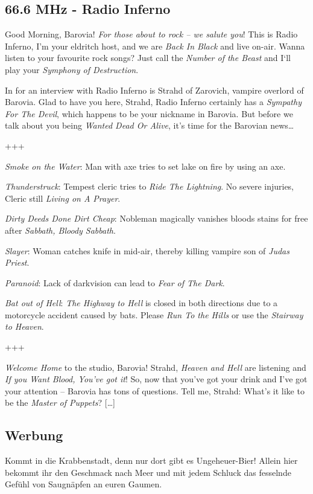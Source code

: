 \documentclass[final]{multiversum}
\begin{document}

\subsection{66.6 MHz - Radio Inferno}
Good Morning, Barovia! \textit{For those about to rock – we salute you}! This is Radio Inferno, I’m your eldritch host, and we are \textit{Back In Black} and live on-air. Wanna listen to your favourite rock songs? Just call the \textit{Number of the Beast} and I‘ll play your \textit{Symphony of Destruction}.

In for an interview with Radio Inferno is Strahd of Zarovich, vampire overlord of Barovia. Glad to have you here, Strahd, Radio Inferno certainly has a \textit{Sympathy For The Devil}, which happens to be your nickname in Barovia. But before we talk about you being \textit{Wanted Dead Or Alive}, it’s time for the Barovian news…

\centerline { +++ }

\textit{Smoke on the Water}: Man with axe tries to set lake on fire by using an axe.

\textit{Thunderstruck}: Tempest cleric tries to \textit{Ride The Lightning}. No severe injuries, Cleric still \textit{Living on A Prayer}.

\textit{Dirty Deeds Done Dirt Cheap}: Nobleman magically vanishes bloods stains for free after \textit{Sabbath, Bloody Sabbath}.

\textit{Slayer}: Woman catches knife in mid-air, thereby killing vampire son of \textit{Judas Priest}.

\textit{Paranoid}: Lack of darkvision can lead to \textit{Fear of The Dark}.

\textit{Bat out of Hell}: \textit{The Highway to Hell} is closed in both directions due to a motorcycle accident caused by bats. Please \textit{Run To the Hills} or use the \textit{Stairway to Heaven}.

\centerline { +++ }

\textit{Welcome Home} to the studio, Barovia! Strahd, \textit{Heaven and Hell} are listening and \textit{If you Want Blood, You’ve got it}! So, now that you’ve got your drink and I’ve got your attention – Barovia has tons of questions. Tell me, Strahd: What's it like to be the \textit{Master of Puppets}? […]


\vfill
\subsection{Werbung}
Kommt in die Krabbenstadt, denn nur dort  gibt es Ungeheuer-Bier!
Allein hier bekommt ihr den Geschmack nach Meer und mit jedem Schluck das fesselnde Gefühl von Saugnäpfen an euren Gaumen.
\end{document}
